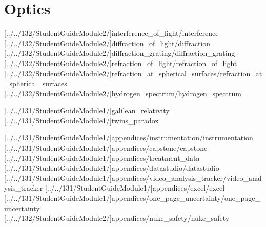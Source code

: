 \documentclass[english,twoside]{article}
\begin{document}
\part{Optics}

[../../132/StudentGuideModule2/]{interference_of_light/interference}
[../../132/StudentGuideModule2/]{diffraction_of_light/diffraction}
[../../132/StudentGuideModule2/]{diffraction_grating/diffraction_grating}
[../../132/StudentGuideModule2/]{refraction_of_light/refraction_of_light}
[../../132/StudentGuideModule2/]{refraction_at_spherical_surfaces/refraction_at_spherical_surfaces}
[../../132/StudentGuideModule2/]{hydrogen_spectrum/hydrogen_spectrum}


[../../131/StudentGuideModule1/]{galilean_relativity}
[../../131/StudentGuideModule1/]{twins_paradox}

\startappendix

[../../131/StudentGuideModule1/]{appendices/instrumentation/instrumentation}
[../../131/StudentGuideModule1/]{appendices/capstone/capstone}
[../../131/StudentGuideModule1/]{appendices/treatment_data}
[../../131/StudentGuideModule1/]{appendices/datastudio/datastudio}
[../../131/StudentGuideModule1/]{appendices/video_analysis_tracker/video_analysis_tracker}
[../../131/StudentGuideModule1/]{appendices/excel/excel}
[../../131/StudentGuideModule1/]{appendices/one_page_uncertainty/one_page_uncertainty}
[../../132/StudentGuideModule2/]{appendices/nuke_safety/nuke_safety}
\end{document}
